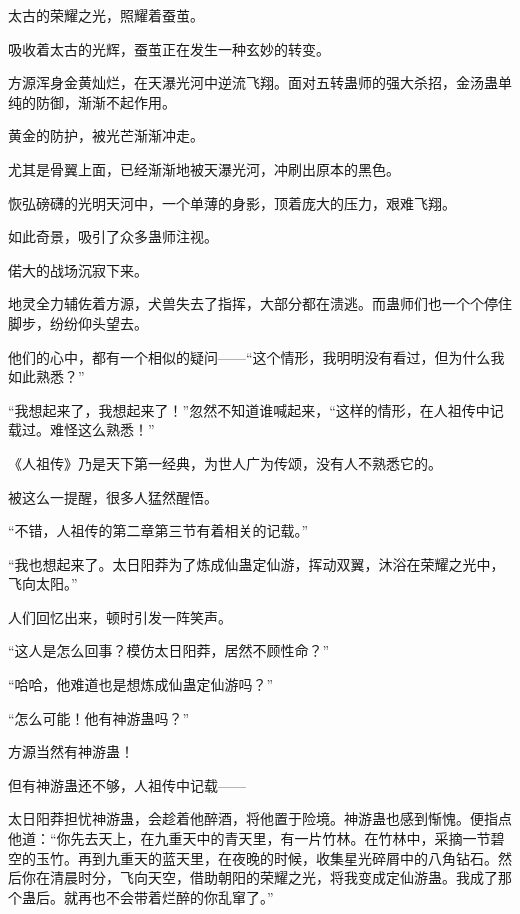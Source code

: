 
\begin{this_body}



太古的荣耀之光，照耀着蚕茧。

吸收着太古的光辉，蚕茧正在发生一种玄妙的转变。

方源浑身金黄灿烂，在天瀑光河中逆流飞翔。面对五转蛊师的强大杀招，金汤蛊单纯的防御，渐渐不起作用。

黄金的防护，被光芒渐渐冲走。

尤其是骨翼上面，已经渐渐地被天瀑光河，冲刷出原本的黑色。

恢弘磅礴的光明天河中，一个单薄的身影，顶着庞大的压力，艰难飞翔。

如此奇景，吸引了众多蛊师注视。

偌大的战场沉寂下来。

地灵全力辅佐着方源，犬兽失去了指挥，大部分都在溃逃。而蛊师们也一个个停住脚步，纷纷仰头望去。

他们的心中，都有一个相似的疑问——“这个情形，我明明没有看过，但为什么我如此熟悉？”

“我想起来了，我想起来了！”忽然不知道谁喊起来，“这样的情形，在人祖传中记载过。难怪这么熟悉！”

《人祖传》乃是天下第一经典，为世人广为传颂，没有人不熟悉它的。

被这么一提醒，很多人猛然醒悟。

“不错，人祖传的第二章第三节有着相关的记载。”

“我也想起来了。太日阳莽为了炼成仙蛊定仙游，挥动双翼，沐浴在荣耀之光中，飞向太阳。”

人们回忆出来，顿时引发一阵笑声。

“这人是怎么回事？模仿太日阳莽，居然不顾性命？”

“哈哈，他难道也是想炼成仙蛊定仙游吗？”

“怎么可能！他有神游蛊吗？”

方源当然有神游蛊！

但有神游蛊还不够，人祖传中记载——

太日阳莽担忧神游蛊，会趁着他醉酒，将他置于险境。神游蛊也感到惭愧。便指点他道：“你先去天上，在九重天中的青天里，有一片竹林。在竹林中，采摘一节碧空的玉竹。再到九重天的蓝天里，在夜晚的时候，收集星光碎屑中的八角钻石。然后你在清晨时分，飞向天空，借助朝阳的荣耀之光，将我变成定仙游蛊。我成了那个蛊后。就再也不会带着烂醉的你乱窜了。”


\end{this_body}
